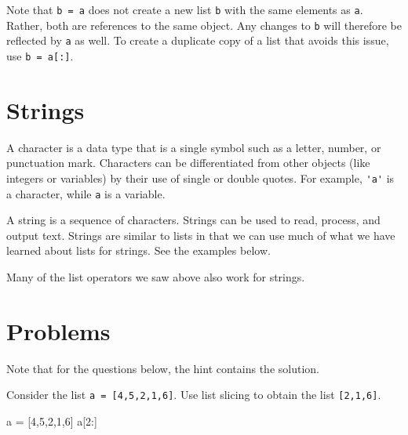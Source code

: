 \documentclass{ximera}
\begin{document}
Note that \verb|b = a| does not create a new list \verb|b| with the same elements as \verb|a|. Rather, both are references to the same object. Any changes to \verb|b| will therefore be reflected by \verb|a| as well. To create a duplicate copy of a list that avoids this issue, use \verb|b = a[:]|.

\section{Strings}

A character is a data type that is a single symbol such as a letter, number, or punctuation mark. Characters can be differentiated from other objects (like integers or variables) by their use of single or double quotes. For example, \verb|'a'| is a character, while \verb|a| is a variable.

A string is a sequence of characters. Strings can be used to read, process, and output text. Strings are similar to lists in that we can use much of what we have learned about lists for strings. See the examples below.

Many of the list operators we saw above also work for strings.



\section{Problems}

Note that for the questions below, the hint contains the solution.

\begin{question}
	Consider the list \verb|a = [4,5,2,1,6]|. Use list slicing to obtain the list \verb|[2,1,6]|.
	\begin{hint}
\begin{sageCell}
a = [4,5,2,1,6]
a[2:]
\end{sageCell}
	\end{hint}
\end{question}
\end{document}
